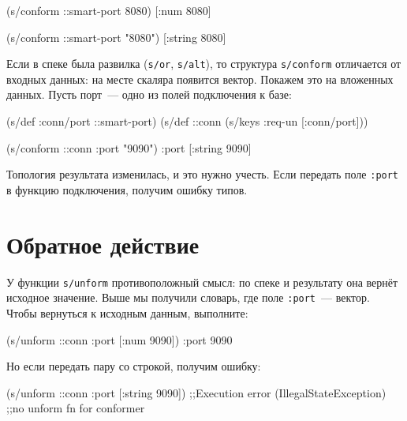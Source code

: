\begin{english}
  \begin{clojure}
(s/conform ::smart-port 8080)
[:num 8080]

(s/conform ::smart-port "8080")
[:string 8080]
  \end{clojure}
\end{english}


Если в спеке была развилка (\verb|s/or|, \verb|s/alt|), то структура
\verb|s/conform| отличается от входных данных: на месте скаляра появится
вектор. Покажем это на вложенных данных. Пусть порт~--- одно из полей
подключения к базе:

\begin{english}
  \begin{clojure}
(s/def :conn/port ::smart-port)
(s/def ::conn
  (s/keys :req-un [:conn/port]))

(s/conform ::conn {:port "9090"})
{:port [:string 9090]}
  \end{clojure}
\end{english}

Топология результата изменилась, и это нужно учесть. Если передать поле
\verb|:port| в функцию подключения, получим ошибку типов.

\section{Обратное действие}


У функции \verb|s/unform| противоположный смысл: по спеке и результату она
вернёт исходное значение. Выше мы получили словарь, где поле \verb|:port|~---
вектор. Чтобы вернуться к исходным данным, выполните:

\begin{english}
  \begin{clojure}
(s/unform ::conn {:port [:num 9090]})
{:port 9090}
  \end{clojure}
\end{english}

\noindent
Но если передать пару со строкой, получим ошибку:

\ifx\DEVICETYPE\MOBILE

\begin{english}
  \begin{clojure}
(s/unform ::conn {:port [:string 9090]})
;;Execution error (IllegalStateException)
;;no unform fn for conformer
  \end{clojure}
\end{english}

